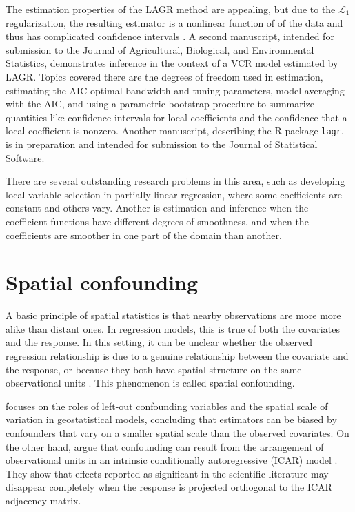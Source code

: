 \documentclass[12pt, oneside]{article}   	%
\begin{document}
The estimation properties of the LAGR method are appealing, but due to
the \(\mathcal{L}_1\) regularization, the resulting estimator is a
nonlinear function of of the data and thus has complicated confidence
intervals \citep{Knight-Fu-2000}. A second manuscript, intended for
submission to the Journal of Agricultural, Biological, and Environmental
Statistics, demonstrates inference in the context of a VCR model
estimated by LAGR. Topics covered there are the degrees of freedom used
in estimation, estimating the AIC-optimal bandwidth and tuning
parameters, model averaging with the AIC, and using a parametric
bootstrap procedure to summarize quantities like confidence intervals
for local coefficients and the confidence that a local coefficient is
nonzero. Another manuscript, describing the R package {\tt lagr}, is in
preparation and intended for submission to the Journal of Statistical
Software.

There are several outstanding research problems in this area, such as
developing local variable selection in partially linear regression,
where some coefficients are constant and others vary. Another is
estimation and inference when the coefficient functions have different
degrees of smoothness, and when the coefficients are smoother in one
part of the domain than another.

\section*{Spatial confounding}\label{spatial-confounding}

A basic principle of spatial statistics is that nearby observations are
more more alike than distant ones. In regression models, this is true of
both the covariates and the response. In this setting, it can be unclear
whether the observed regression relationship is due to a genuine
relationship between the covariate and the response, or because they
both have spatial structure on the same observational units
\citep{Hodges-Reich-2010,Paciorek-2010}. This phenomenon is called
spatial confounding.

\cite{Paciorek-2010} focuses on the roles of left-out confounding variables
and the spatial scale of variation in geostatistical models, concluding
that estimators can be biased by confounders that vary on a smaller
spatial scale than the observed covariates. On the other hand,
\cite{Hodges-Reich-2010} argue that confounding can result from the
arrangement of observational units in an intrinsic conditionally
autoregressive (ICAR) model \citep{Besag-York-Mollie-1991}. They show that
effects reported as significant in the scientific literature may
disappear completely when the response is projected orthogonal to the
ICAR adjacency matrix.
\end{document}
